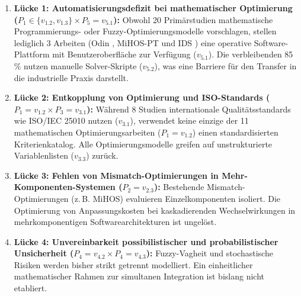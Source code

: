 \begin{enumerate}
    \item \textbf{Lücke 1: Automatisierungsdefizit bei mathematischer Optimierung ($P_1 \in \{v_{1.2}, v_{1.3}\} \times P_5 = v_{5.1}$):}  
    Obwohl 20 Primärstudien mathematische Programmierungs- oder Fuzzy-Optimierungsmodelle vorschlagen, stellen lediglich 3 Arbeiten (Odin \cite{ZQMG69VT}, MiHOS-PT \cite{9F79VAAB} und IDS \cite{LNQHES84}) eine operative Software-Plattform mit Benutzeroberfläche zur Verfügung ($v_{5.1}$). Die verbleibenden 85 \% nutzen manuelle Solver-Skripte ($v_{5.2}$), was eine Barriere für den Transfer in die industrielle Praxis darstellt.
    
    \item \textbf{Lücke 2: Entkopplung von Optimierung und ISO-Standards ($P_1 = v_{1.2} \times P_3 = v_{3.1}$):}  
    Während 8 Studien internationale Qualitätsstandards wie ISO/IEC 25010 nutzen ($v_{3.1}$), verwendet keine einzige der 11 mathematischen Optimierungsarbeiten ($P_1 = v_{1.2}$) einen standardisierten Kriterienkatalog. Alle Optimierungsmodelle greifen auf unstrukturierte Variablenlisten ($v_{3.3}$) zurück.
    
    \item \textbf{Lücke 3: Fehlen von Mismatch-Optimierungen in Mehr-Komponenten-Systemen ($P_2 = v_{2.3}$):}  
    Bestehende Mismatch-Optimierungen (z.\,B. MiHOS) evaluieren Einzelkomponenten isoliert. Die Optimierung von Anpassungskosten bei kaskadierenden Wechselwirkungen in mehrkomponentigen Softwarearchitekturen ist ungelöst.
    
    \item \textbf{Lücke 4: Unvereinbarkeit possibilistischer und probabilistischer Unsicherheit ($P_4 = v_{4.2} \times P_4 = v_{4.3}$):}  
    Fuzzy-Vagheit und stochastische Risiken werden bisher strikt getrennt modelliert. Ein einheitlicher mathematischer Rahmen zur simultanen Integration ist bislang nicht etabliert.
\end{enumerate}
